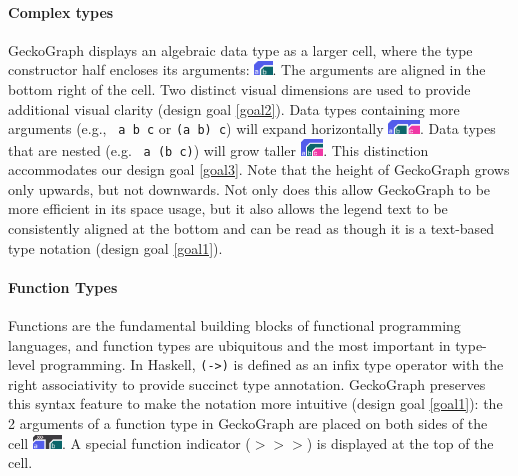 \documentclass[preprint,12pt]{elsarticle}
\begin{document}
\paragraph{Complex types}
GeckoGraph displays an algebraic data type as a larger cell, where the type constructor half encloses its arguments: \includegraphics[height=1em]{figures/DataType.png}. The arguments are aligned in the bottom right of the cell. Two distinct visual dimensions are used to provide additional visual clarity (design goal \ref{goal2}). Data types containing more arguments (e.g., \texttt{ a b c} or \texttt{(a b) c}) will expand horizontally \includegraphics[height=1em]{figures/DataTypeWide.png}. Data types that are nested (e.g. \texttt{ a (b c)}) will grow taller \includegraphics[height=1.2em]{figures/DataTypeNested.png}. This distinction accommodates our design goal \ref{goal3}. Note that the height of GeckoGraph grows only upwards, but not downwards. Not only does this allow GeckoGraph to be more efficient in its space usage, but it also allows the legend text to be consistently aligned at the bottom and can be read as though it is a text-based type notation (design goal \ref{goal1}).  

\paragraph{Function Types}
Functions are the fundamental building blocks of functional programming languages, and function types are ubiquitous and the most important in type-level programming. In Haskell, \texttt{(->)} is defined as an infix type operator with the right associativity to provide succinct type annotation. GeckoGraph preserves this syntax feature to make the notation more intuitive (design goal \ref{goal1}): the 2 arguments of a function type in GeckoGraph are placed on both sides of the cell \includegraphics[height=1em]{figures/Function.png}. A special function indicator (\texttt{$>>>$}) is displayed at the top of the cell. 
\end{document}
